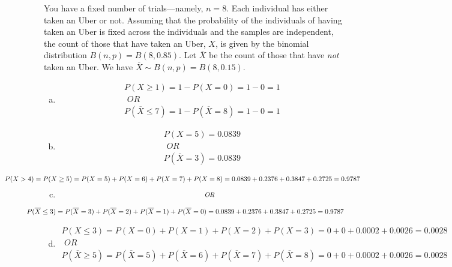 \documentclass[11pt,letterpaper]{article}
\begin{document}
\sol You have a fixed number of trials---namely, $n= 8$. Each individual has either taken an Uber or not. Assuming that the probability of the individuals of having taken an Uber is fixed across the individuals and the samples are independent, the count of those that have taken an Uber, $X$, is given by the binomial distribution $B(n, p)= B(8, 0.85)$. Let $\overline{X}$ be the count of those that have \textit{not} taken an Uber. We have $\overline{X} \sim B(n, p)= B(8, 0.15)$. 

\begin{enumerate}[(a)]
\item 
	\[
	\begin{gathered}
	P(X \geq 1)= 1 - P(X= 0)= 1 - 0= 1 \\[0.3cm]
	\textit{ OR } \\[0.3cm]
	P(\overline{X} \leq 7)= 1 - P(\overline{X}= 8)= 1 - 0= 1
	\end{gathered}
	\] \pspace

\item 
	\[
	\begin{gathered}
	P(X= 5)= 0.0839 \\[0.3cm]
	\textit{ OR } \\[0.3cm]
	P(\overline{X}= 3)= 0.0839
	\end{gathered}
	\] \pspace

\item 
	\[
	\begin{gathered}
	\hspace{-2.8cm} P(X > 4)= P(X \geq 5)= P(X= 5) + P(X= 6) + P(X= 7) + P(X= 8)= 0.0839 + 0.2376 + 0.3847 + 0.2725= 0.9787 \\[0.3cm]
	\textit{ OR } \\[0.3cm]
	\hspace{-2.5cm} P(\overline{X} \leq 3)= P(\overline{X}= 3) + P(\overline{X}= 2) + P(\overline{X}= 1) + P(\overline{X}= 0)= 0.0839 + 0.2376 + 0.3847 + 0.2725= 0.9787
	\end{gathered}
	\] \pspace

\item 
	\[
	\begin{gathered}
	P(X \leq 3)= P(X= 0) + P(X= 1) + P(X= 2) + P(X= 3)= 0 + 0 + 0.0002 + 0.0026= 0.0028 \\[0.3cm]
	\textit{ OR } \\[0.3cm]
	P(\overline{X} \geq 5)= P(\overline{X}= 5) + P(\overline{X}= 6) + P(\overline{X}= 7) + P(\overline{X}= 8)= 0 + 0 + 0.0002 + 0.0026= 0.0028
	\end{gathered}
	\]
\end{enumerate}
\end{document}
